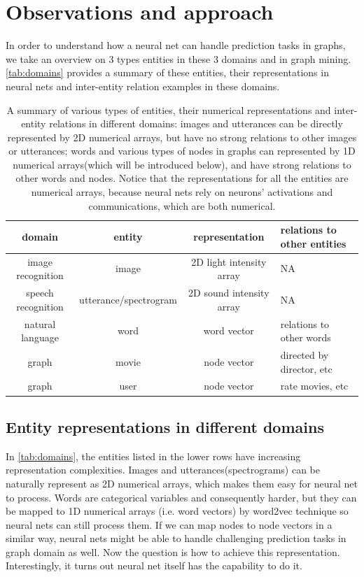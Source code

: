 \documentclass{article}
\begin{document}
\section{Observations and approach}
In order to understand how a neural net can handle prediction tasks in graphs, we take an overview on 3 types entities in these 3 domains and in graph mining. \autoref{tab:domains} provides a summary of these entities, their representations in neural nets and inter-entity relation examples in these domains.
\begin{table}[H]
	\centering
	\begin{tabularx}{\textwidth}{ |c|c|c|X| }
		\hline domain & entity & representation & relations to other entities 
		\\ 
		\hline image recognition & image & 2D light intensity array & NA \\ 
		\hline speech recognition & utterance/spectrogram & 2D sound intensity array & NA \\ 
		\hline natural language & word & word vector & relations to other words \\ 
		\hline graph & movie & node vector & directed by director, etc \\ 
		\hline graph & user & node vector & rate movies, etc \\
		\hline
	\end{tabularx}
	\caption{A summary of various types of entities, their numerical representations and inter-entity relations in different domains: images and utterances can be directly represented by 2D numerical arrays, but have no strong relations to other images or utterances; words and various types of nodes in graphs can represented by 1D numerical arrays(which will be introduced below), and have strong relations to other words and nodes. Notice that the representations for all the entities are numerical arrays, because neural nets rely on neurons' activations and communications, which are both numerical.}
	\label{tab:domains}
\end{table}

\subsection{Entity representations in different domains}
In \autoref{tab:domains}, the entities listed in the lower rows have increasing representation complexities. Images and utterances(spectrograms) can be naturally represent as 2D numerical arrays, which makes them easy for neural net to process. Words are categorical variables and consequently harder, but they can be mapped to 1D numerical arrays (i.e. word vectors) by word2vec technique \cite{mikolov2013efficient} so neural nets can still process them.
If we can map nodes to node vectors in a similar way, neural nets might be able to handle challenging prediction tasks in graph domain as well.
Now the question is how to achieve this representation. Interestingly, it turns out neural net itself has the capability to do it.
\end{document}
